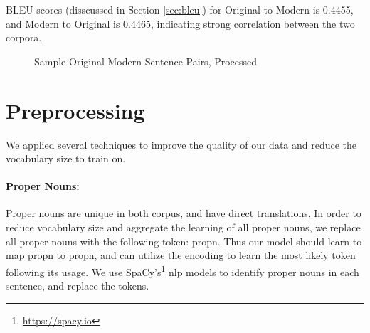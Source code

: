 \documentclass[twoside,twocolumn]{article}
\begin{document}
BLEU scores (disscussed in Section \ref{sec:bleu}) for Original to Modern is
0.4455, and Modern to Original is 0.4465, indicating strong correlation between
the two corpora.
\begin{figure*}[ht]
  \centering
  \caption{Sample Original-Modern Sentence Pairs, Processed}
  \label{fig:sample-pairs}
\end{figure*}
\section{Preprocessing}
\label{sec:preprocess}
We applied several techniques to improve the quality of our data and reduce the
vocabulary size to train on.
\paragraph{Proper Nouns:}
Proper nouns are unique in both corpus, and have direct translations. In order
to reduce vocabulary size and aggregate the learning of all proper nouns,
we replace all proper nouns with the following token: propn. Thus our model
should learn to map propn to propn, and can utilize the encoding to learn the
most likely token following its usage. We use
SpaCy's\footnote{\url{https://spacy.io}} nlp models to identify
proper nouns in each sentence, and replace the tokens.
\end{document}
